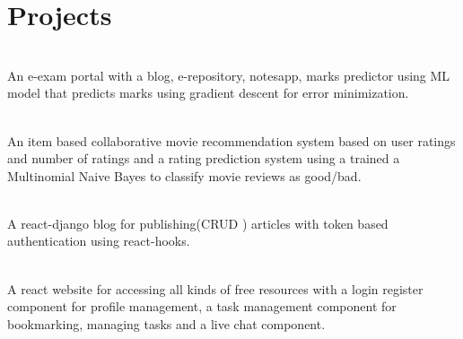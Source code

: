 \documentclass[]{deedy-resume-openfont}
\begin{document}
\section{Projects}
\raggedright

    \hfill {}\\
    An e-exam portal with a blog, e-repository, notesapp, marks predictor using ML model that predicts marks using gradient descent for error minimization.\\
    \sectionsep
  

    \hfill {}\\
    An item based collaborative movie recommendation system based on user ratings and number of ratings and a rating prediction system using a trained a Multinomial Naive Bayes to classify movie reviews as good/bad.\\
    \sectionsep
  

    \hfill {}\\
    A react-django blog for publishing(CRUD ) articles with token based authentication using react-hooks. \\
    \sectionsep
  

    \hfill {}\\
    A react website for accessing all kinds of free resources with a login register component for profile management, a task management component for bookmarking, managing tasks and a live chat component.\\
    \sectionsep
%
%
\end{document}
